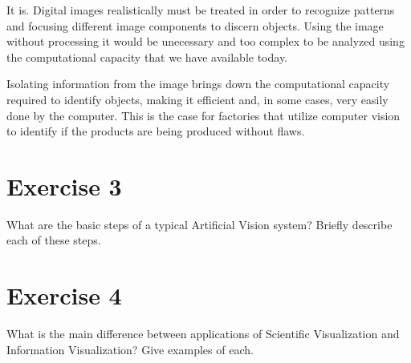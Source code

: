 \documentclass[english,a4paper]{article}
\begin{document}
  \begin{mdframed}
    \begin{small}
      It is. Digital images realistically must be treated in order to recognize patterns and focusing different image components to discern objects. Using the image without processing it would be unecessary and too complex to be analyzed using the computational capacity that we have available today.

      Isolating information from the image brings down the computational capacity required to identify objects, making it efficient and, in some cases, very easily done by the computer. This is the case for factories that utilize computer vision to identify if the products are being produced without flaws.
    \end{small}
  \end{mdframed}


\section*{Exercise 3}

  What are the basic steps of a typical Artificial Vision system? Briefly describe each of these steps.

  \begin{mdframed}
    \begin{small}

    \end{small}
  \end{mdframed}


\section*{Exercise 4}

  What is the main difference between applications of Scientific Visualization and Information Visualization?  Give examples of each.

  \begin{mdframed}
    \begin{small}

    \end{small}
  \end{mdframed}
\end{document}
